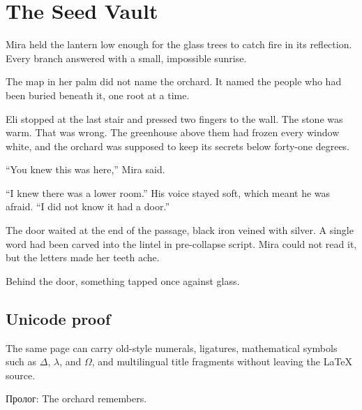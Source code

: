 \chapter{The Seed Vault}

Mira held the lantern low enough for the glass trees to catch fire in its
reflection. Every branch answered with a small, impossible sunrise.

The map in her palm did not name the orchard. It named the people who had been
buried beneath it, one root at a time.

Eli stopped at the last stair and pressed two fingers to the wall. The stone was
warm. That was wrong. The greenhouse above them had frozen every window white,
and the orchard was supposed to keep its secrets below forty-one degrees.

``You knew this was here,'' Mira said.

``I knew there was a lower room.'' His voice stayed soft, which meant he was
afraid. ``I did not know it had a door.''

The door waited at the end of the passage, black iron veined with silver. A
single word had been carved into the lintel in pre-collapse script. Mira could
not read it, but the letters made her teeth ache.

Behind the door, something tapped once against glass.

\section*{Unicode proof}

The same page can carry old-style numerals, ligatures, mathematical symbols
such as $\Delta$, $\lambda$, and $\Omega$, and multilingual title fragments
without leaving the LaTeX source.

{\DisplayFont Пролог: The orchard remembers.}

